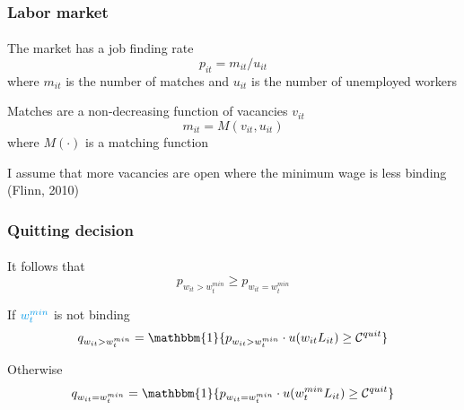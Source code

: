 \begin{frame}

    \frametitle{Labor market} %
    \framesubtitle{}  %
    \rmfamily %

    \begin{wideitemize}
        \item The market has a \textcolor{fblu}{job finding rate} 
        \[
            p_{it} = m_{it}/u_{it} 
        \]
        where \(m_{it}\) is the \textcolor{fblu}{number of matches} and \(u_{it}\) is the \textcolor{fblu}{number of unemployed workers}
        
        \item Matches are a non-decreasing function of vacancies \(v_{it}\)
        \[
            m_{it} = M(v_{it}, u_{it})
        \]
        where \(M\left(\cdot \right) \) is a matching function
        \item I assume that more vacancies are open where the minimum wage is less binding ({\footnotesize  \textcolor{fgre}{Flinn, 2010}})
    \end{wideitemize}

\end{frame}


\begin{frame}

    \frametitle{Quitting decision} %
    \framesubtitle{}  %
    \rmfamily %

    \begin{wideitemize}
        \item It follows that
        \[
            p_{w_{it} > w^{min}_t} \geq p_{w_{it} = w^{min}_t}
        \]
        \vspace{-15pt}
        \item If \(\textcolor{fblu}{w^{min}_t}\) is not binding
        \[
            q_{w_{it} > w^{min}_t} = \mathbbm{1}\{p_{w_{it} > w^{min}_t}\cdot u(w_{it}L_{it}) \geq \mathcal{C}^{quit}\}
        \]
        \vspace{-15pt}
        \item Otherwise
        \[
            q_{w_{it} = w^{min}_t} = \mathbbm{1}\{p_{w_{it} = w^{min}_t}\cdot u(w^{min}_t L_{it}) \geq \mathcal{C}^{quit}\} 
        \]

    \end{wideitemize}
    
\end{frame}


